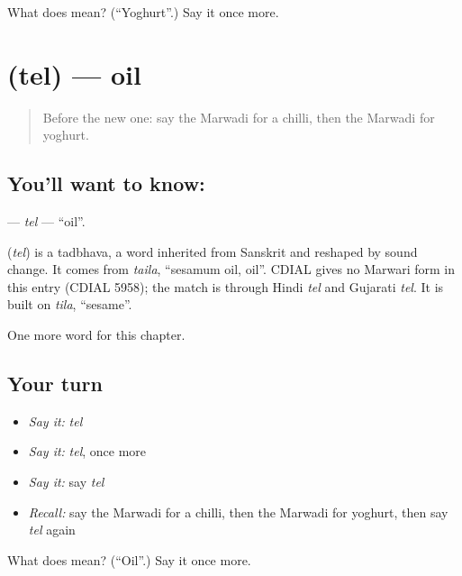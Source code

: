 \begin{tcolorbox}[breakable,colback=teal!4,colframe=teal!35!black,title={Before you move on}]
What does  mean? (\textquotedblleft{}Yoghurt\textquotedblright{}.) Say it once more.
\end{tcolorbox}
\section[\texorpdfstring{\mw{तेल} (tel)}{तेल (tel)}]{ (tel) — oil}

\label{lesson:MW-C60-tel}



\begin{quote}
Before the new one: say the Marwadi for a chilli, then the Marwadi for yoghurt.
\end{quote}

\subsection*{You'll want to know: }
\textbf{} — \emph{tel} — \textquotedblleft{}oil\textquotedblright{}.

\begin{cousinweb}
\textbf{} (\emph{tel}) is a tadbhava, a word inherited from Sanskrit and reshaped by sound change. It comes from \emph{taila}, \textquotedblleft{}sesamum oil, oil\textquotedblright{}. CDIAL gives no Marwari form in this entry (CDIAL 5958); the match is through Hindi \emph{tel} and Gujarati \emph{tel}. It is built on \emph{tila}, \textquotedblleft{}sesame\textquotedblright{}.
\end{cousinweb}

\begin{grammarlens}[title={What you've built}]
One more word for this chapter.
\end{grammarlens}

\subsection*{Your turn}
\begin{itemize}
\raggedright
  \item \emph{Say it:} \emph{tel}
  \item \emph{Say it:} \emph{tel}, once more
  \item \emph{Say it:} say \emph{tel}
  \item \emph{Recall:} say the Marwadi for a chilli, then the Marwadi for yoghurt, then say \emph{tel} again
\end{itemize}

\begin{tcolorbox}[breakable,colback=teal!4,colframe=teal!35!black,title={Before you move on}]
What does  mean? (\textquotedblleft{}Oil\textquotedblright{}.) Say it once more.
\end{tcolorbox}
